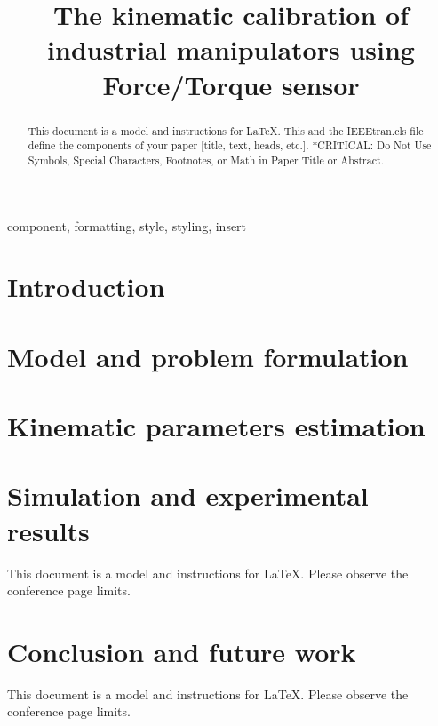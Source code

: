 \documentclass[conference]{IEEEtran}
\begin{document}
\title{
    The kinematic calibration of industrial manipulators using Force/Torque sensor
}

\author{
}

\maketitle

\begin{abstract}
    This document is a model and instructions for \LaTeX.
    This and the IEEEtran.cls file define the components of your paper [title, text, heads, etc.]. *CRITICAL: Do Not Use Symbols, Special Characters, Footnotes,
or Math in Paper Title or Abstract.
\end{abstract}

\begin{IEEEkeywords}
    component, formatting, style, styling, insert
\end{IEEEkeywords}

\section{Introduction}


\section{Model and problem formulation}


\section{Kinematic parameters estimation}


\section{Simulation and experimental results}
This document is a model and instructions for \LaTeX.
Please observe the conference page limits.

\section{Conclusion and future work}
This document is a model and instructions for \LaTeX.
Please observe the conference page limits.
\end{document}
